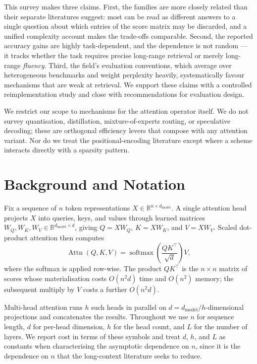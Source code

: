 \documentclass[11pt]{article}
\begin{document}
This survey makes three claims. First, the families are more closely related than their separate literatures suggest: most can be read as different answers to a single question about which entries of the score matrix may be discarded, and a unified complexity account makes the trade-offs comparable. Second, the reported accuracy gains are highly task-dependent, and the dependence is not random --- it tracks whether the task requires precise long-range retrieval or merely long-range \emph{fluency}. Third, the field's evaluation conventions, which average over heterogeneous benchmarks and weight perplexity heavily, systematically favour mechanisms that are weak at retrieval. We support these claims with a controlled reimplementation study and close with recommendations for evaluation design.

We restrict our scope to mechanisms for the attention operator itself. We do not survey quantisation, distillation, mixture-of-experts routing, or speculative decoding; these are orthogonal efficiency levers that compose with any attention variant. Nor do we treat the positional-encoding literature except where a scheme interacts directly with a sparsity pattern.

\section{Background and Notation}
\label{sec:background}

Fix a sequence of $n$ token representations $X \in \mathbb{R}^{n \times d_{\text{model}}}$. A single attention head projects $X$ into queries, keys, and values through learned matrices $W_Q, W_K, W_V \in \mathbb{R}^{d_{\text{model}} \times d}$, giving $Q = X W_Q$, $K = X W_K$, and $V = X W_V$. Scaled dot-product attention then computes
\[
  \operatorname{Attn}(Q, K, V) = \operatorname{softmax}\!\left( \frac{Q K^\top}{\sqrt{d}} \right) V,
\]
where the softmax is applied row-wise. The product $Q K^\top$ is the $n \times n$ matrix of scores whose materialisation costs $O(n^2 d)$ time and $O(n^2)$ memory; the subsequent multiply by $V$ costs a further $O(n^2 d)$.

Multi-head attention runs $h$ such heads in parallel on $d = d_{\text{model}} / h$-dimensional projections and concatenates the results. Throughout we use $n$ for sequence length, $d$ for per-head dimension, $h$ for the head count, and $L$ for the number of layers. We report cost in terms of these symbols and treat $d$, $h$, and $L$ as constants when characterising the asymptotic dependence on $n$, since it is the dependence on $n$ that the long-context literature seeks to reduce.
\end{document}
